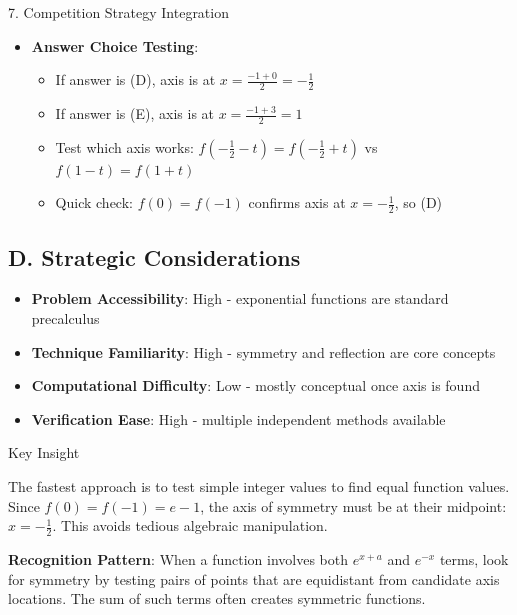 \documentclass[12pt]{article}
\begin{document}
\begin{competitionbox}{7. Competition Strategy Integration}
\begin{itemize}[leftmargin=*]
    \item \textbf{Answer Choice Testing}:
    \begin{itemize}
        \item If answer is (D), axis is at $x = \frac{-1+0}{2} = -\frac{1}{2}$
        \item If answer is (E), axis is at $x = \frac{-1+3}{2} = 1$
        \item Test which axis works: $f(-\frac{1}{2}-t) = f(-\frac{1}{2}+t)$ vs $f(1-t) = f(1+t)$
        \item Quick check: $f(0) = f(-1)$ confirms axis at $x = -\frac{1}{2}$, so (D)
    \end{itemize}
\end{itemize}

\subsection*{D. Strategic Considerations}
\begin{itemize}[leftmargin=*]
    \item \textbf{Problem Accessibility}: High - exponential functions are standard precalculus
    \item \textbf{Technique Familiarity}: High - symmetry and reflection are core concepts
    \item \textbf{Computational Difficulty}: Low - mostly conceptual once axis is found
    \item \textbf{Verification Ease}: High - multiple independent methods available
\end{itemize}

\end{competitionbox}

\begin{highlightbox}{Key Insight}

The fastest approach is to test simple integer values to find equal function values. Since $f(0) = f(-1) = e - 1$, the axis of symmetry must be at their midpoint: $x = -\frac{1}{2}$. This avoids tedious algebraic manipulation.

\vspace{0.5em}
\noindent\textbf{Recognition Pattern}: When a function involves both $e^{x+a}$ and $e^{-x}$ terms, look for symmetry by testing pairs of points that are equidistant from candidate axis locations. The sum of such terms often creates symmetric functions.

\end{highlightbox}
\end{document}
